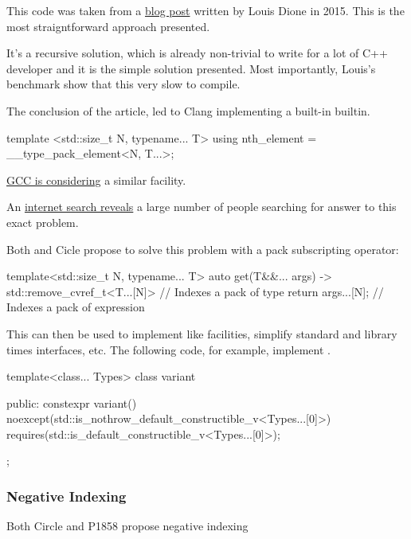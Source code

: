 \documentclass{wg21}
\begin{document}
This code was taken from a \href{https://ldionne.com/2015/11/29/efficient-parameter-pack-indexing/}{blog post} written by Louis Dione in 2015.
This is the most straigntforward approach presented.

It's a recursive solution, which is already non-trivial to write for a lot of C++ developer and it is the simple solution presented.
Most importantly, Louis's benchmark show that this very slow to compile.

The conclusion of the article, led to Clang implementing a built-in  builtin.

\begin{colorblock}
template <std::size_t N, typename... T>
using nth_element = __type_pack_element<N, T...>;
\end{colorblock}

\href{https://gcc.gnu.org/bugzilla/show_bug.cgi?id=100157}{GCC is considering} a similar facility.

An \href{https://gcc.gnu.org/bugzilla/show_bug.cgi?id=100157}{internet search reveals} a large number of people searching for answer to this exact problem.

Both  and Cicle propose to solve this problem with a pack subscripting operator:

\begin{colorblock}
template<std::size_t N, typename... T>
auto get(T&&... args) -> std::remove_cvref_t<T...[N]> // Indexes a pack of type {
    return args...[N]; // Indexes a pack of expression
}
\end{colorblock}

This can then be used to implement  like facilities, simplify standard and library times interfaces, etc.
The following code, for example, implement .

\begin{colorblock}
template<class... Types>
class variant {
public:
    constexpr variant()
    noexcept(std::is_nothrow_default_constructible_v<Types...[0]>)
    requires(std::is_default_constructible_v<Types...[0]>);

};
\end{colorblock}

\subsubsection{Negative Indexing}

Both Circle and P1858 propose negative indexing
\end{document}
